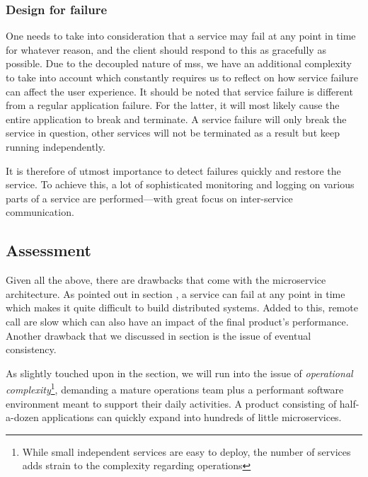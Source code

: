 \subsubsection{Design for failure}
\label{sec:design-for-failure}

One needs to take into consideration that a service may fail at any
point in time for whatever reason, and the client should respond to
this as gracefully as possible. Due to the decoupled nature of
\glspl{ms}, we have an additional complexity to take into account
which constantly requires us to reflect on how service failure can
affect the user experience. \cite{ms-definition} It should be noted
that service failure is different from a regular application failure.
For the latter, it will most likely cause the entire application to
break and terminate. A service failure will only break the service in
question, other services will not be terminated as a result but keep
running independently.

It is therefore of utmost importance to detect failures quickly and
restore the service. To achieve this, a lot of sophisticated
monitoring and logging on various parts of a service are
performed---with great focus on inter-service communication.
\cite{ms-definition}


\subsection{Assessment}%

Given all the above, there are drawbacks that come with the
microservice architecture. As pointed out in
section , a service can fail at any point
in time which makes it quite difficult to build distributed systems.
Added to this, remote call are slow which can also have an impact of
the final product's performance. Another drawback that we discussed
in section  is the issue of eventual
consistency.

As slightly touched upon in the
 section, we will run into the
issue of \textit{operational complexity}\footnote{While small
	independent services are easy to deploy, the number of services adds
strain to the complexity regarding operations}, demanding a mature
operations team plus a performant software environment meant to
support their daily activities.
A product consisting of half-a-dozen applications can
quickly expand into hundreds of little microservices.
\cite{ms-trade-off}

